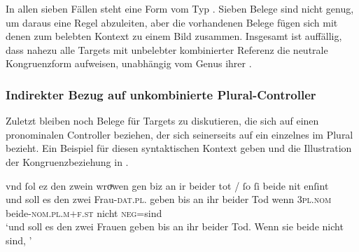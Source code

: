 In allen sieben Fällen steht eine Form vom Typ . Sieben Belege
sind nicht genug, um daraus eine Regel abzuleiten, aber die vorhandenen Belege
fügen sich mit denen zum belebten Kontext zu einem Bild zusammen. Insgesamt ist
auffällig, dass nahezu alle Targets mit unbelebter kombinierter Referenz die
neutrale Kongruenzform  aufweisen, unabhängig vom Genus ihrer
.


\subsubsection{Indirekter Bezug auf unkombinierte Plural-Controller}
\label{subsubsec:beid2p2snglncao}

Zuletzt bleiben noch Belege für Targets zu diskutieren, die sich auf einen
pronominalen Controller beziehen, der sich seinerseits auf ein einzelnes
 im Plural bezieht. Ein Beispiel für diesen syntaktischen
Kontext geben  und die Illustration der
Kongruenzbeziehung in
.

\begin{exe}
\ex \label{ex:beid2p2snglncao}
	\gll vnd ſol ez den zwein wroͮwen gen biz an ir beider tot / ſo
			ſi beide nit enſint \textelp{} \\
		und soll es den zwei Frau-\textsc{dat.pl.\FemF} geben bis an ihr
			beider Tod {} wenn \textsc{3pl\subF.nom}
			beide-\textsc{nom.pl.m+f\subF.st} nicht \textsc{neg}=sind {} \\
	\trans `und soll es den zwei Frauen geben bis an ihr beider Tod.
		Wenn sie beide nicht  sind, \textelp{}'
		\parencites(Nr.~2568, Sirnau, Kr.~Esslingen, 1297)[3,31]{cao4}
\end{exe}

